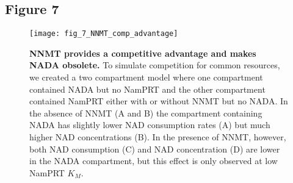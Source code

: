 \newpage


\subsection{Figure 7}

\begin{figure}[ht]
  \centering
  \texttt{[image: fig\_7\_NNMT\_comp\_advantage]}
  \caption{\textbf{NNMT provides a competitive advantage and makes NADA obsolete.} To simulate competition for common resources, we created a two compartment model where one compartment contained NADA but no NamPRT and the other compartment contained NamPRT either with or without NNMT but no NADA. In the absence of NNMT (A and B) the compartment containing NADA has slightly lower NAD consumption rates (A) but much higher NAD concentrations (B). In the presence of NNMT, however, both NAD consumption (C) and NAD concentration (D) are lower in the NADA compartment, but this effect is only observed at low NamPRT $K_M$.}
  \label{fig:NNMT_comp_advantage}
\end{figure}

\newpage
